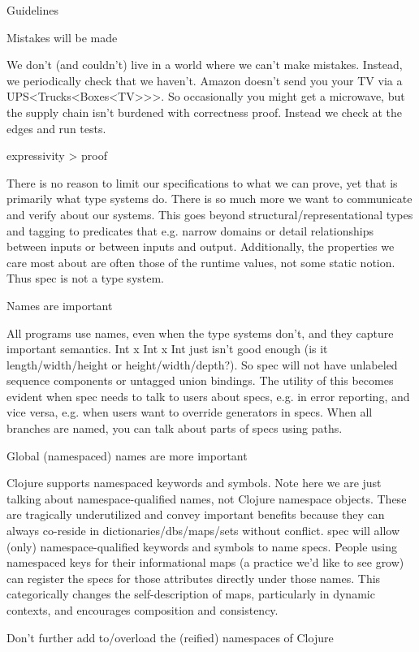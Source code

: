 Guidelines

Mistakes will be made

We don’t (and couldn’t) live in a world where we can’t make mistakes. Instead, we periodically check that we haven’t. Amazon doesn’t send you your TV via a UPS<Trucks<Boxes<TV>>>. So occasionally you might get a microwave, but the supply chain isn’t burdened with correctness proof. Instead we check at the edges and run tests.

expressivity > proof

There is no reason to limit our specifications to what we can prove, yet that is primarily what type systems do. There is so much more we want to communicate and verify about our systems. This goes beyond structural/representational types and tagging to predicates that e.g. narrow domains or detail relationships between inputs or between inputs and output. Additionally, the properties we care most about are often those of the runtime values, not some static notion. Thus spec is not a type system.

Names are important

All programs use names, even when the type systems don’t, and they capture important semantics. Int x Int x Int just isn’t good enough (is it length/width/height or height/width/depth?). So spec will not have unlabeled sequence components or untagged union bindings. The utility of this becomes evident when spec needs to talk to users about specs, e.g. in error reporting, and vice versa, e.g. when users want to override generators in specs. When all branches are named, you can talk about parts of specs using paths.

Global (namespaced) names are more important

Clojure supports namespaced keywords and symbols. Note here we are just talking about namespace-qualified names, not Clojure namespace objects. These are tragically underutilized and convey important benefits because they can always co-reside in dictionaries/dbs/maps/sets without conflict. spec will allow (only) namespace-qualified keywords and symbols to name specs. People using namespaced keys for their informational maps (a practice we’d like to see grow) can register the specs for those attributes directly under those names. This categorically changes the self-description of maps, particularly in dynamic contexts, and encourages composition and consistency.

Don’t further add to/overload the (reified) namespaces of Clojure

